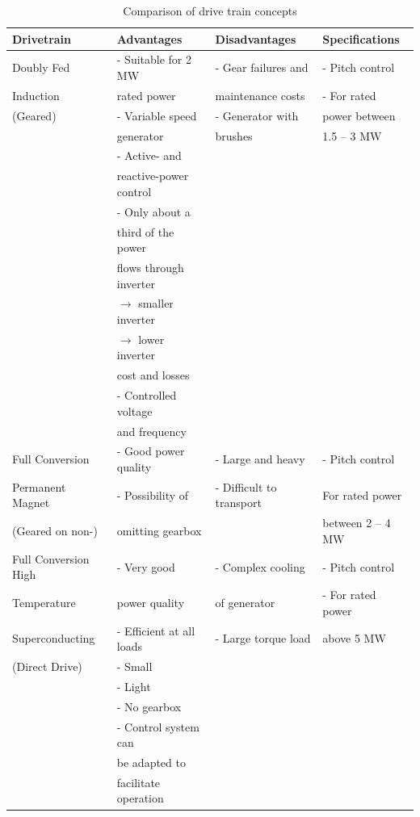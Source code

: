 \begin{table}[H]
\hspace*{-2.cm}
\centering
\caption{Comparison of drive train concepts}
\label{tab:comparison_dt}
\begin{tabular}{ |l|l|l|l| }
 \hline
 \textbf{Drivetrain} & \textbf{Advantages} & \textbf{Disadvantages} & \textbf{Specifications} \\ 
 \hline
 Doubly Fed & - Suitable for 2 MW & - Gear failures and & - Pitch control\\ 
  Induction & rated power &  maintenance costs & - For rated\\ 
 (Geared) & - Variable speed & - Generator with & power between\\
  & generator & brushes & 1.5 – 3 MW\\
  & - Active- and & & \\
  & reactive-power control & &\\
  & - Only about a &  & \\
  & third of the power &  & \\
  & flows through inverter & & \\
  & $\to$ smaller inverter & & \\
  & $\to$ lower inverter & & \\
  & cost and losses & & \\
  & - Controlled voltage & & \\
  & and frequency & & \\
  \hline
  Full Conversion & - Good power quality & - Large and heavy & - Pitch control\\
  Permanent Magnet & - Possibility of & - Difficult to transport & For rated power \\
  (Geared on non-) & omitting gearbox & & between 2 – 4 MW \\
  \hline
 Full Conversion High & - Very good & - Complex cooling & - Pitch control\\
 Temperature & power quality & of generator & - For rated power\\
 Superconducting & - Efficient at all loads & - Large torque load & above 5 MW\\
 (Direct Drive) & - Small & & \\
  & - Light & & \\
  & - No gearbox & & \\
  & - Control system can & & \\
  & be adapted to & & \\
  & facilitate operation & & \\

\end{tabular}
\end{table}
